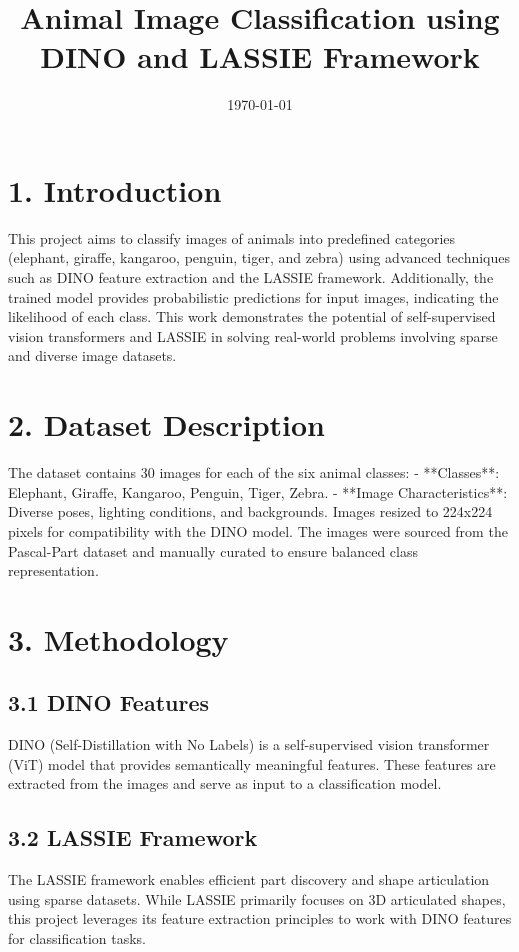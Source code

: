 \documentclass{article}%
\title{Animal Image Classification using DINO and LASSIE Framework}%
\author{}%
\date{\today}%
\begin{document}
%
\normalsize%
\maketitle%
\section{1. Introduction}%
\label{sec:1.Introduction}%
This project aims to classify images of animals into predefined categories (elephant, giraffe, kangaroo, penguin, tiger, and zebra) using advanced techniques such as DINO feature extraction and the LASSIE framework. Additionally, the trained model provides probabilistic predictions for input images, indicating the likelihood of each class. This work demonstrates the potential of self{-}supervised vision transformers and LASSIE in solving real{-}world problems involving sparse and diverse image datasets.

%
\section{2. Dataset Description}%
\label{sec:2.DatasetDescription}%
The dataset contains 30 images for each of the six animal classes:\newline%
{-} **Classes**: Elephant, Giraffe, Kangaroo, Penguin, Tiger, Zebra.\newline%
{-} **Image Characteristics**: Diverse poses, lighting conditions, and backgrounds. Images resized to 224x224 pixels for compatibility with the DINO model.\newline%
The images were sourced from the Pascal{-}Part dataset and manually curated to ensure balanced class representation.

%
\section{3. Methodology}%
\label{sec:3.Methodology}%
\subsection{3.1 DINO Features}%
\label{subsec:3.1DINOFeatures}%
DINO (Self{-}Distillation with No Labels) is a self{-}supervised vision transformer (ViT) model that provides semantically meaningful features. These features are extracted from the images and serve as input to a classification model.

%
\subsection{3.2 LASSIE Framework}%
\label{subsec:3.2LASSIEFramework}%
The LASSIE framework enables efficient part discovery and shape articulation using sparse datasets. While LASSIE primarily focuses on 3D articulated shapes, this project leverages its feature extraction principles to work with DINO features for classification tasks.
\end{document}
